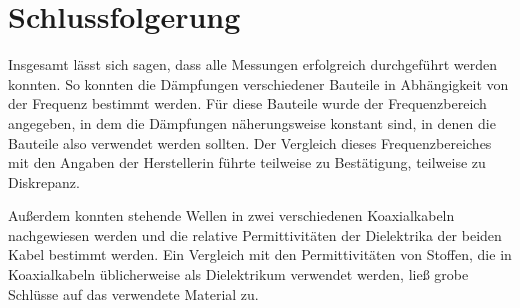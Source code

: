 \documentclass[
	a4paper,
	12pt,
	pagesize,
	ngerman
]{scrartcl}
\begin{document}
	\section{Schlussfolgerung}
	Insgesamt lässt sich sagen, dass alle Messungen erfolgreich durchgeführt werden konnten.
	So konnten die Dämpfungen verschiedener Bauteile in Abhängigkeit von der Frequenz bestimmt werden.
	Für diese Bauteile wurde der Frequenzbereich angegeben, in dem die Dämpfungen näherungsweise konstant sind, in denen die Bauteile also verwendet werden sollten.
	Der Vergleich dieses Frequenzbereiches mit den Angaben der Herstellerin führte teilweise zu Bestätigung, teilweise zu Diskrepanz.

	Außerdem konnten stehende Wellen in zwei verschiedenen Koaxialkabeln nachgewiesen werden und die relative Permittivitäten der Dielektrika der beiden Kabel bestimmt werden.
	Ein Vergleich mit den Permittivitäten von Stoffen, die in Koaxialkabeln üblicherweise als Dielektrikum verwendet werden, ließ grobe Schlüsse auf das verwendete Material zu.

	\printbibliography
\end{document}
